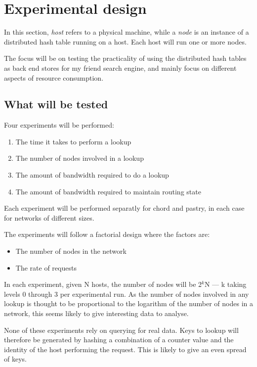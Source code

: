 \section{Experimental design}
In this section, \textit{host} refers to a physical machine, while a \textit{node} is an instance of a distributed hash table running on a host. Each host will run one or more nodes.

The focus will be on testing the practicality of using the distributed hash tables as back end stores for my friend search engine, and mainly focus on different aspects of resource consumption.

\subsection{What will be tested}
Four experiments will be performed: 

\begin{enumerate}
\item The time it takes to perform a lookup
\item The number of nodes involved in a lookup
\item The amount of bandwidth required to do a lookup
\item The amount of bandwidth required to maintain routing state
\end{enumerate}

Each experiment will be performed separatly for chord and pastry, in each case for networks of different sizes.

The experiments will follow a factorial design where the factors are:
\begin{itemize}
\item The number of nodes in the network
\item The rate of requests
\end{itemize}

In each experiment, given N hosts, the number of nodes will be 2$^{k}$N --- k taking levels 0 through 3 per experimental run. As the number of nodes involved in any lookup is thought to be proportional to the logarithm of the number of nodes in a network, this seems likely to give interesting data to analyse.

None of these experiments rely on querying for real data. Keys to lookup will therefore be generated by hashing a combination of a counter value and the identity of the host performing the request. This is likely to give an even spread of keys.

